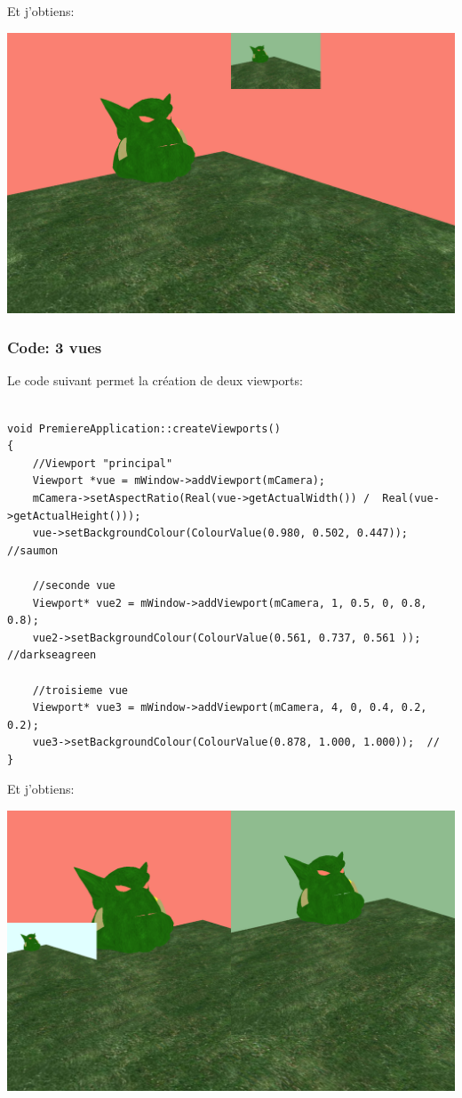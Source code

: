Et j'obtiens:
	\begin{center}
	\includegraphics[scale=0.25]{Ogre/1_Base_de_Ogre/2_Se_reperer_ds_l_espace/Images/plusieursViewport.png} 
	\end{center}






\subsubsection{Code: 3 vues}
Le code suivant permet la création de deux viewports:


\begin{lstlisting}[caption={createViewports: création de plusieurs vues}]

void PremiereApplication::createViewports()
{
    //Viewport "principal"
    Viewport *vue = mWindow->addViewport(mCamera);
    mCamera->setAspectRatio(Real(vue->getActualWidth()) /  Real(vue->getActualHeight()));
    vue->setBackgroundColour(ColourValue(0.980, 0.502, 0.447)); //saumon

	//seconde vue
    Viewport* vue2 = mWindow->addViewport(mCamera, 1, 0.5, 0, 0.8, 0.8);
    vue2->setBackgroundColour(ColourValue(0.561, 0.737, 0.561 ));  //darkseagreen

	//troisieme vue
	Viewport* vue3 = mWindow->addViewport(mCamera, 4, 0, 0.4, 0.2, 0.2);
    vue3->setBackgroundColour(ColourValue(0.878, 1.000, 1.000));  //
}
\end{lstlisting}

Et j'obtiens:
	\begin{center}
	\includegraphics[scale=0.25]{Ogre/1_Base_de_Ogre/2_Se_reperer_ds_l_espace/Images/plusieursViewport2.png} 
	\end{center}
